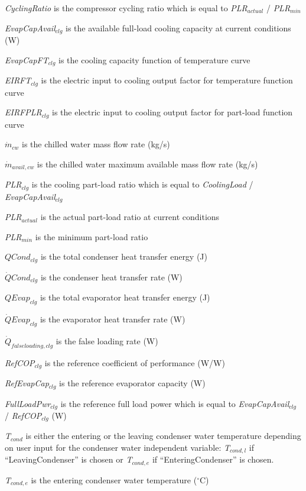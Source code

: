 \emph{CyclingRatio} is the compressor cycling ratio which is equal to \emph{PLR\(_{actual}\)} / \emph{PLR\(_{min}\)}

\emph{EvapCapAvail\(_{clg}\)} is the available full-load cooling capacity at current conditions (W)

\emph{EvapCapFT\(_{clg}\)} is the cooling capacity function of temperature curve

\emph{EIRFT\(_{clg}\)} is the electric input to cooling output factor for temperature function curve

\emph{EIRFPLR\(_{clg}\)} is the electric input to cooling output factor for part-load function curve

\({\dot m_{cw}}\) is the chilled water mass flow rate (kg/s)

\({\dot m_{avail,cw}}\) is the chilled water maximum available mass flow rate (kg/s)

\emph{PLR\(_{clg}\)} is the cooling part-load ratio which is equal to \emph{CoolingLoad} / \emph{EvapCapAvail\(_{clg}\)}

\emph{PLR\(_{actual}\)} is the actual part-load ratio at current conditions

\emph{PLR\(_{min}\)} is the minimum part-load ratio

\(QCon{d_{clg}}\) is the total condenser heat transfer energy (J)

\(\dot QCon{d_{clg}}\) is the condenser heat transfer rate (W)

\(QEva{p_{clg}}\) is the total evaporator heat transfer energy (J)

\(\dot QEva{p_{clg}}\) is the evaporator heat transfer rate (W)

\({\dot Q_{falseloading,clg}}\) is the false loading rate (W)

\emph{RefCOP\(_{clg}\)} is the reference coefficient of performance (W/W)

\emph{RefEvapCap\(_{clg}\)} is the reference evaporator capacity (W)

\emph{FullLoadPwr\(_{clg}\)} is the reference full load power which is equal to \emph{EvapCapAvail\(_{clg}\)} / \emph{RefCOP\(_{clg}\)} (W)

\emph{T\(_{cond}\)} is either the entering or the leaving condenser water temperature depending on user input for the condenser water independent variable: \emph{T\(_{cond,l}\)} if ``LeavingCondenser'' is chosen or \emph{T\(_{cond,e}\)} if ``EnteringCondenser'' is chosen.

\emph{T\(_{cond,e}\)} is the entering condenser water temperature (\(^{\circ}\)C)

